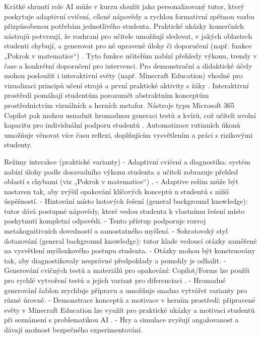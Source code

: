Krátké shrnutí role
AI může v kurzu sloužit jako personalizovaný tutor, který poskytuje adaptivní cvičení, cílené nápovědy a rychlou formativní zpětnou vazbu přizpůsobenou potřebám jednotlivého studenta.
Praktické ukázky komerčních nástrojů potvrzují, že rozhraní pro učitele umožňují sledovat, v jakých oblastech studenti chybují, a generovat pro ně upravené úlohy či doporučení (např. funkce „Pokrok v matematice“) \cite{kb_ai_101_tipu_pdf_04e4a115_page_8_1}.
Tyto funkce učitelům nabízí přehledy výkonu, trendy v čase a konkrétní doporučení pro intervenci.
Pro demonstrační a didaktické účely mohou posloužit i interaktivní světy (např. Minecraft Education) vhodné pro vizualizaci principů učení strojů a první praktické aktivity s žáky \cite{kb_ai_101_tipu_pdf_04e4a115_page_15_2}.
Interaktivní prostředí pomáhají studentům porozumět abstraktním konceptům prostřednictvím vizuálních a herních metafor.
Nástroje typu Microsoft 365 Copilot pak mohou usnadnit hromadnou generaci testů a kvízů, což učiteli uvolní kapacitu pro individuální podporu studentů \cite{kb_ai_101_tipu_pdf_04e4a115_page_36_1}.
Automatizace rutinních úkonů umožňuje věnovat více času reflexi, doplňujícím vysvětlením a práci s rizikovými studenty.

Režimy interakce (praktické varianty)
- Adaptivní cvičení a diagnostika: systém nabízí úlohy podle dosavadního výkonu studenta a učiteli zobrazuje přehled oblastí s chybami (viz „Pokrok v matematice“) \cite{kb_ai_101_tipu_pdf_04e4a115_page_8_1}.
- Adaptive režim může být nastaven tak, aby zvýšil opakování klíčových konceptů u studentů s nižší úspěšností.
- Hintování místo hotových řešení (general background knowledge): tutor dává postupné nápovědy, které vedou studenta k vlastnímu řešení místo poskytnutí kompletní odpovědi.
- Tento přístup podporuje rozvoj metakognitivních dovedností a samostatného myšlení.
- Sokratovský styl dotazování (general background knowledge): tutor klade vedoucí otázky zaměřené na vysvětlení myšlenkového postupu studenta.
- Otázky mohou být konstruovány tak, aby diagnostikovaly nesprávné předpoklady a pomohly je odhalit.
- Generování cvičných testů a materiálů pro opakování: Copilot/Forms lze použít pro rychlé vytvoření testů a jejich variant pro diferenciaci \cite{kb_ai_101_tipu_pdf_04e4a115_page_36_1}.
- Hromadné generování šablon zrychluje přípravu a umožňuje snadno vytvářet varianty pro různé úrovně.
- Demonstrace konceptů a motivace v herním prostředí: připravené světy v Minecraft Education lze využít pro praktické ukázky a motivaci studentů při seznámení s problematikou AI \cite{kb_ai_101_tipu_pdf_04e4a115_page_15_2}.
- Hry a simulace zvyšují angažovanost a dávají možnost bezpečného experimentování.

